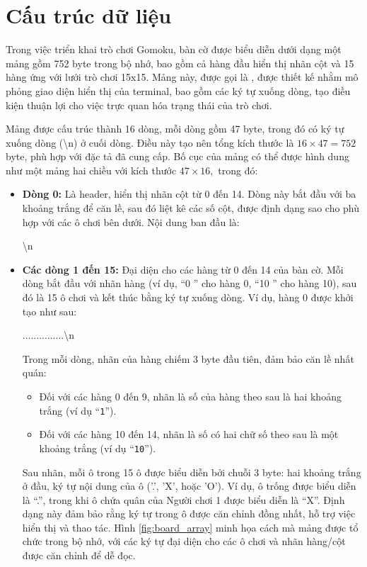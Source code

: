 \section{Cấu trúc dữ liệu}
Trong việc triển khai trò chơi Gomoku, bàn cờ được biểu diễn dưới dạng một mảng gồm 752 byte trong bộ nhớ, bao gồm cả hàng đầu hiển thị nhãn cột và 15 hàng ứng với lưới trò chơi 15x15. Mảng này, được gọi là , được thiết kế nhằm mô phỏng giao diện hiển thị của terminal, bao gồm các ký tự xuống dòng, tạo điều kiện thuận lợi cho việc trực quan hóa trạng thái của trò chơi.

Mảng  được cấu trúc thành 16 dòng, mỗi dòng gồm 47 byte, trong đó có ký tự xuống dòng (\textbackslash n) ở cuối dòng. Điều này tạo nên tổng kích thước là \( 16 \times 47 = 752 \) byte, phù hợp với đặc tả đã cung cấp. Bố cục của mảng có thể được hình dung như một mảng hai chiều với kích thước \( 47 \times 16, \)
trong đó:
\begin{itemize}
    \item \textbf{Dòng 0:} Là header, hiển thị nhãn cột từ 0 đến 14. Dòng này bắt đầu với ba khoảng trắng để căn lề, sau đó liệt kê các số cột, được định dạng sao cho phù hợp với các ô chơi bên dưới. Nội dung ban đầu là:
          \begin{center}
              \ttfamily
              \vs \vs {}\vs {}\vs {}\vs {}\vs {}\vs {}\vs {}\vs {}\vs {}\vs {}\textbackslash n
          \end{center}
    \item \textbf{Các dòng 1 đến 15:} Đại diện cho các hàng từ 0 đến 14 của bàn cờ. Mỗi dòng bắt đầu với nhãn hàng (ví dụ, “0 ” cho hàng 0, “10 ” cho hàng 10), sau đó là 15 ô chơi và kết thúc bằng ký tự xuống dòng. Ví dụ, hàng 0 được khởi tạo như sau:
          \begin{center}
              \vs\vs .\vs\vs .\vs\vs .\vs\vs .\vs\vs .\vs\vs .\vs\vs .\vs\vs .\vs\vs .\vs\vs .\vs\vs .\vs\vs .\vs\vs .\vs\vs .\vs\vs .\textbackslash n
          \end{center}
          Trong mỗi dòng, nhãn của hàng chiếm 3 byte đầu tiên, đảm bảo căn lề nhất quán:
          \begin{itemize}
              \item Đối với các hàng 0 đến 9, nhãn là số của hàng theo sau là hai khoảng trắng (ví dụ “\texttt{1\vs\vs}”).
              \item Đối với các hàng 10 đến 14, nhãn là số có hai chữ số theo sau là một khoảng trắng (ví dụ “\texttt{10\vs}”).
          \end{itemize}
          Sau nhãn, mỗi ô trong 15 ô được biểu diễn bởi chuỗi 3 byte: hai khoảng trắng ở đầu, ký tự nội dung của ô ('.', 'X', hoặc 'O'). Ví dụ, ô trống được biểu diễn là “.”, trong khi ô chứa quân của Người chơi 1 được biểu diễn là “X”. Định dạng này đảm bảo rằng ký tự trong ô được căn chỉnh đồng nhất, hỗ trợ việc hiển thị và thao tác. Hình \ref{fig:board_array} minh họa cách mà mảng  được tổ chức trong bộ nhớ, với các ký tự đại diện cho các ô chơi và nhãn hàng/cột được căn chỉnh để dễ đọc.
\end{itemize}


